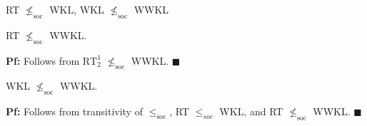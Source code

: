 \begin{frame}{RT $\nleq_{\text{soc}}$ WKL, WKL $\nleq_{\text{soc}}$ WWKL}
  \begin{coro}
    \label{coro:rt-wwkl}
    RT $\nleq_{\text{soc}}$ WWKL.
  \end{coro}
  \textbf{Pf:} Follows from $\text{RT}_2^1$ $\nleq_{\text{soc}}$ WWKL.
  $\blacksquare$

  \vspace{2em}
  \begin{coro}
    WKL $\nleq_{\text{soc}}$ WWKL.
  \end{coro}
  \textbf{Pf:} Follows from transitivity of $\leq_\text{soc}$,
  RT $\leq_{soc}$ WKL, and RT $\nleq_{\text{soc}}$ WWKL. $\blacksquare$
\end{frame}
